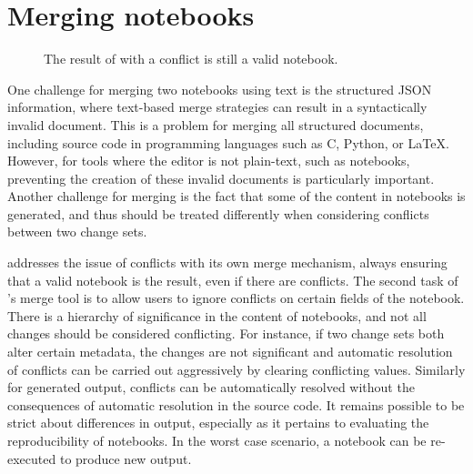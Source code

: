 \documentclass{deliverablereport}
\begin{document}

\section{Merging notebooks} %
\label{sec:merging_notebooks}

\begin{figure}
    \center
    \caption{The result of \nbmerge with a conflict is still a valid notebook.}
    \label{fig:nbmerge}
\end{figure}

One challenge for merging two notebooks using text is the structured JSON information, where
text-based merge strategies can result in a syntactically invalid document. This is a problem for
merging all structured documents, including source code in programming languages such as C, Python,
or \LaTeX. However, for tools where the editor is not plain-text, such as notebooks, preventing the
creation of these invalid documents is particularly important. Another challenge for merging is the
fact that some of the content in notebooks is generated, and thus should be treated differently
when considering conflicts between two change sets.

\nbdime addresses the issue of conflicts with its own merge mechanism, always ensuring that a valid notebook is the result, even if there are conflicts.
The second task of \nbdime's merge tool is to allow users to ignore conflicts on certain fields of the notebook.
There is a hierarchy of significance in the content of notebooks,
and not all changes should be considered conflicting.
For instance, if two change sets both alter certain metadata,
the changes are not significant and automatic resolution of conflicts
can be carried out aggressively by clearing conflicting values.
Similarly for generated output, conflicts can be automatically resolved without the consequences of automatic resolution in the source code.
It remains possible to be strict about differences in output,
especially as it pertains to evaluating the reproducibility of notebooks.
In the worst case scenario, a notebook can be re-executed to produce new output.
\end{document}
